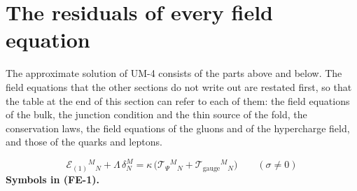 \documentclass[
  10pt,
]{article}
\begin{document}
\hypertarget{the-residuals-of-every-field-equation}{%
\section{The residuals of every field
equation}\label{the-residuals-of-every-field-equation}}

The approximate solution of UM-4 consists of the parts above and below.
The field equations that the other sections do not write out are
restated first, so that the table at the end of this section can refer
to each of them: the field equations of the bulk, the junction condition
and the thin source of the fold, the conservation laws, the field
equations of the gluons and of the hypercharge field, and those of the
quarks and leptons.

\[
\mathcal{E}_{(1)}{}^M{}_N + \Lambda\,\delta^M_N = \kappa\,\big(\mathcal{T}_\Psi{}^M{}_N + \mathcal{T}_{\mathrm{gauge}}{}^M{}_N\big)
 \qquad (\sigma \ne 0) \tag{FE-1}
\] \textbf{Symbols in (FE-1).}
\end{document}
